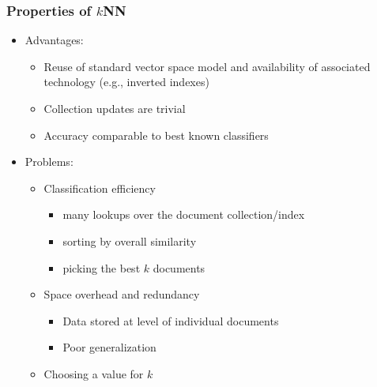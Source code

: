 \documentclass{beamer}
\begin{document}

\begin{frame}
  \frametitle{Properties of $k$NN}

  \begin{itemize}
  \item Advantages:
        \begin{itemize}
        \item Reuse of standard vector space model and availability of associated technology (e.g., inverted indexes)
        \item Collection updates are trivial
        \item Accuracy comparable to best known classifiers
        \end{itemize}
  \item<+-> Problems:
        \begin{itemize}
        \item Classification efficiency
            \begin{itemize}
            \item many lookups over the document collection/index
            \item sorting by overall similarity
            \item picking the best $k$ documents
            \end{itemize}
        \item Space overhead and redundancy
             \begin{itemize}
             \item Data stored at level of individual documents
             \item Poor generalization
             \end{itemize}
        \item Choosing a value for $k$
        \end{itemize}
  \end{itemize}

\end{frame}

\end{document}
